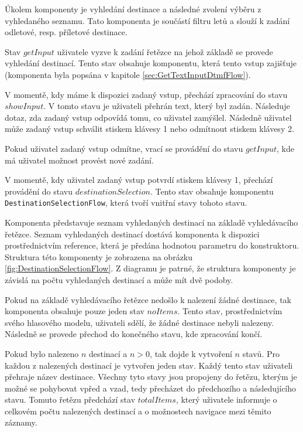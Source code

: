 \documentclass[ing,male,java,dept460]{diploma}						%
\begin{document}
Úkolem komponenty je vyhledání destinace a následné zvolení výběru z vyhledaného seznamu. Tato komponenta je součástí filtru letů a slouží k zadání odletové, resp. příletové destinace.

Stav $getInput$ uživatele vyzve k zadání řetězce na jehož základě se provede vyhledání destinací. Tento stav obsahuje komponentu, která tento vstup zajišťuje (komponenta byla popsána v kapitole \ref{sec:GetTextInputDtmfFlow}).

V momentě, kdy máme k dispozici zadaný vstup, přechází zpracování do stavu $showInput$. V tomto stavu je uživateli přehrán text, který byl zadán. Následuje dotaz, zda zadaný vstup odpovídá tomu, co uživatel zamýšlel. Následně uživatel může zadaný vstup schválit stiskem klávesy 1 nebo odmítnout stiskem klávesy 2.

Pokud uživatel zadaný vstup odmítne, vrací se provádění do stavu $getInput$, kde má uživatel možnost provést nové zadání.

V momentě, kdy uživatel zadaný vstup potvrdí stiskem klávesy 1, přechází provádění do stavu $destinationSelection$. Tento stav obsahuje komponentu \texttt{DestinationSelectionFlow}, která tvoří vnitřní stavy tohoto stavu.

Komponenta představuje seznam vyhledaných destinací na základě vyhledávacího řetězce. Seznam vyhledaných destinací dostává komponenta k dispozici prostřednictvím reference, která je předána hodnotou parametru do konstruktoru. Struktura této komponenty je zobrazena na obrázku \ref{fig:DestinationSelectionFlow}. Z diagramu je patrné, že struktura komponenty je závislá na počtu vyhledaných destinací a může mít dvě podoby.

Pokud na základě vyhledávacího řetězce nedošlo k nalezení žádné destinace, tak komponenta obsahuje pouze jeden stav $noItems$. Tento stav, prostřednictvím svého hlasového modelu, uživateli sdělí, že žádné destinace nebyli nalezeny. Následně se provede přechod do konečného stavu, kde zpracování končí.

Pokud bylo nalezeno $n$ destinací a $n > 0$, tak dojde k vytvoření $n$ stavů. Pro každou z nalezených destinací je vytvořen jeden stav. Každý tento stav uživateli přehraje název destinace. Všechny tyto stavy jsou propojeny do řetězu, kterým je možné se pohybovat vpřed a vzad, tedy přecházet do předchozího a následujícího stavu. Tomuto řetězu předchází stav $totalItems$, který uživatele informuje o celkovém počtu nalezených destinací a o možnostech navigace mezi těmito záznamy.
\end{document}
